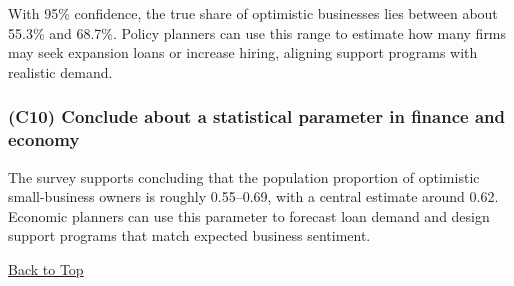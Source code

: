 With 95\% confidence, the true share of optimistic businesses lies between about 55.3\% and 68.7\%. Policy planners can use this range to estimate how many firms may seek expansion loans or increase hiring, aligning support programs with realistic demand.

\subsubsection{(C10) Conclude about a statistical parameter in finance and economy}\label{subsubsec:interval-example2-1-c10}

The survey supports concluding that the population proportion of optimistic small-business owners is roughly 0.55--0.69, with a central estimate around 0.62. Economic planners can use this parameter to forecast loan demand and design support programs that match expected business sentiment.

\vspace{6pt}
\noindent\hyperref[table-of-contents]{Back to Top}
